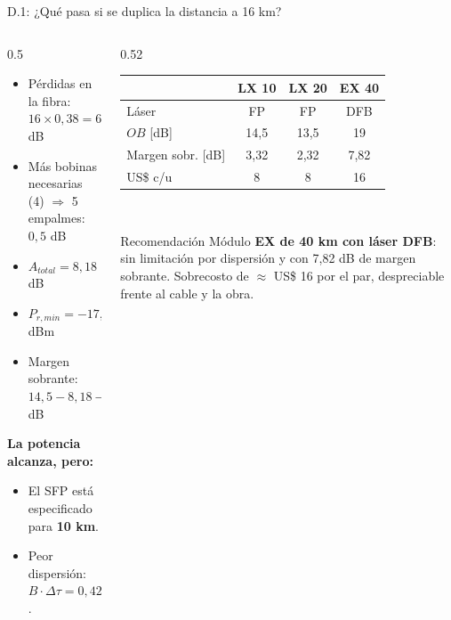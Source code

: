 \begin{frame}{D.1: ¿Qué pasa si se duplica la distancia a 16 km?}
  \begin{columns}[T]
    \begin{column}{0.5\textwidth}
      \begin{itemize}
        \item Pérdidas en la fibra:\\ $16 \times 0{,}38 = 6{,}08$ dB
        \item Más bobinas necesarias (4) $\Rightarrow$ 5 empalmes: $0{,}5$ dB
        \item $A_{total} = 8{,}18$ dB 
        \item $P_{r,min} = -17{,}68$ dBm
        \item Margen sobrante:\\ $14{,}5 - 8{,}18 - 3 = 3{,}32$ dB
      \end{itemize}
      \vspace{0.1cm}
      \textbf{La potencia alcanza, pero:}
      \begin{itemize}
        \item El SFP está especificado para \textbf{10 km}.
        \item Peor dispersión:\\ $B \cdot \Delta\tau = 0{,}42 > 0{,}25$.
      \end{itemize}
    \end{column}
    \begin{column}{0.52\textwidth}
      \small
      \setlength{\tabcolsep}{4pt}
      \begin{tabular}{lccc}
        \toprule
        & \textbf{LX 10} & \textbf{LX 20} & \textbf{EX 40} \\
        \midrule
        Láser & FP & FP & DFB \\
        $OB$ [dB] & 14,5 & 13,5 & 19 \\
        Margen sobr. [dB] & 3,32 & 2,32 & 7,82 \\
        US\$ c/u & 8 & 8 & 16 \\
        \bottomrule
      \end{tabular}\\[0.2cm]
      \normalsize
      \begin{block}{Recomendación}
        Módulo \textbf{EX de 40 km con láser DFB}: sin limitación por dispersión y con 7,82 dB de margen sobrante. Sobrecosto de $\approx$ US\$ 16 por el par, despreciable frente al cable y la obra.
      \end{block}
    \end{column}
  \end{columns}
\end{frame}

